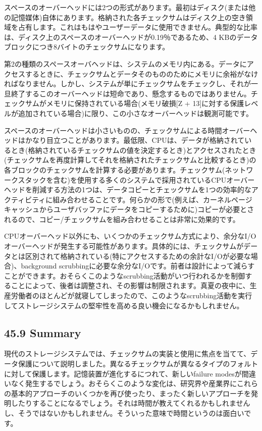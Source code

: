 スペースのオーバーヘッドには2つの形式があります。最初はディスク(または他の記憶媒体)自体にあります。格納された各チェックサムはディスク上の空き領域を占有します。これはもはやユーザーデータに使用できません。典型的な比率は、ディスク上のスペースのオーバーヘッドが0.19％であるため、4
KBのデータブロックにつき8バイトのチェックサムになります。

第2の種類のスペースオーバヘッドは、システムのメモリ内にある。データにアクセスするときに、チェックサムとデータそのもののためにメモリに余裕がなければなりません。しかし、システムが単にチェックサムをチェックし、それが一旦終了するこのオーバーヘッドは短命であり、懸念するものではありません。チェックサムがメモリに保持されている場合(メモリ破損{[}Z
+
13{]}に対する保護レベルが追加されている場合)に限り、この小さなオーバーヘッドは観測可能です。

スペースのオーバーヘッドは小さいものの、チェックサムによる時間オーバーヘッドはかなり目立つことがあります。最低限、CPUは、データが格納されているとき(格納されているチェックサムの値を決定するとき)とアクセスされたとき(チェックサムを再度計算してそれを格納されたチェックサムと比較するとき)の各ブロックのチェックサムを計算する必要があります。チェックサム(ネットワークスタックを含む)を使用する多くのシステムで採用されているCPUオーバーヘッドを削減する方法の1つは、データコピーとチェックサムを1つの効率的なアクティビティに組み合わせることです。何らかの形で(例えば、カーネルページキャッシュからユーザバッファにデータをコピーするために)コピーが必要とされるので、コピー/チェックサムを組み合わせることは非常に効果的です。

CPUオーバーヘッド以外にも、いくつかのチェックサム方式により、余分なI/Oオーバーヘッドが発生する可能性があります。具体的には、チェックサムがデータとは区別されて格納されている(特にアクセスするための余計なI/Oが必要な場合)、background
scrubbingに必要な余分なI/Oです。前者は設計によって減らすことができます。おそらくこのようなscrubbing活動がいつ行われるかを制御することによって、後者は調整され、その影響は制限されます。真夏の夜中に、生産労働者のほとんどが就寝してしまったので、このようなscrubbing活動を実行してストレージシステムの堅牢性を高める良い機会になるかもしれません。

\hypertarget{summary-33}{%
\subsection*{45.9 Summary}\label{summary-33}}

現代のストレージシステムでは、チェックサムの実装と使用に焦点を当てて、データ保護について説明しました。異なるチェックサムが異なるタイプのフォルトに対して保護します。記憶装置が進化するにつれて、新しいfailure
modesが間違いなく発生するでしょう。おそらくこのような変化は、研究界や産業界にこれらの基本的アプローチのいくつかを再び使ったり、まったく新しいアプローチを発明したりすることになるでしょう。それは時間が教えてくれるかもしれませんし、そうではないかもしれません。そういった意味で時間というのは面白いです。

